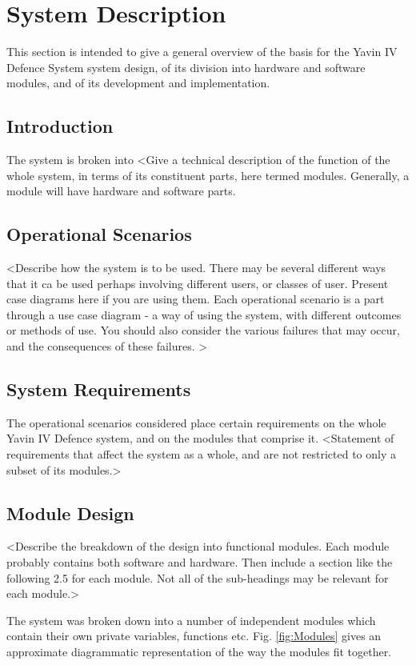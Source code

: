 \documentclass[]{report}
\begin{document}
\chapter{System Description}
This section is intended to give a general overview of the basis for the Yavin IV Defence System system design, of its division into hardware and software modules, and of its development and implementation.

\section{Introduction}
The system is broken into 
<Give a technical description of the function of the whole system, in terms of its constituent parts, here termed modules. Generally, a module will have hardware and software parts.

\section{Operational Scenarios}
<Describe how the system is to be used. There may be several different ways that it ca be used perhaps involving different users, or classes of user. Present case diagrams here if you are using them. Each operational scenario is a part through a use case diagram - a way of using the system, with different outcomes or methods of use. You should also consider the various failures that may occur, and the consequences of these failures. >

\section{System Requirements}
The operational scenarios considered place certain requirements on the whole Yavin IV Defence system, and on the modules that comprise it.
<Statement of requirements that affect the system as a whole, and are not restricted to only a subset of its modules.>

\section{Module Design}
<Describe the breakdown of the design into functional modules. Each module probably contains both software and hardware.
Then include a section like the following 2.5 for each module. Not all of the sub-headings may be relevant for each module.>

The system was broken down into a number of independent modules which contain their own private variables, functions etc. Fig. \ref{fig:Modules} gives an approximate diagrammatic representation of the way the modules fit together.
\end{document}
